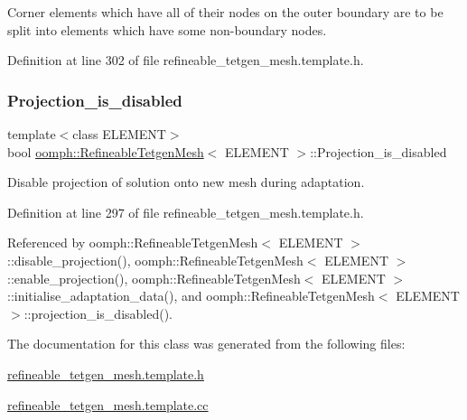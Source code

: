 Corner elements which have all of their nodes on the outer boundary are to be split into elements which have some non-\/boundary nodes. 



Definition at line 302 of file refineable\+\_\+tetgen\+\_\+mesh.\+template.\+h.

\mbox{\label{classoomph_1_1RefineableTetgenMesh_a274ebedf983f3b34620fa2bbb1980fcd}} 
\subsubsection{\texorpdfstring{Projection\+\_\+is\+\_\+disabled}{Projection\_is\_disabled}}
{\footnotesize\ttfamily template$<$class E\+L\+E\+M\+E\+NT$>$ \\
bool \hyperlink{classoomph_1_1RefineableTetgenMesh}{oomph\+::\+Refineable\+Tetgen\+Mesh}$<$ E\+L\+E\+M\+E\+NT $>$\+::Projection\+\_\+is\+\_\+disabled\hspace{0.3cm}{\ttfamily [protected]}}



Disable projection of solution onto new mesh during adaptation. 



Definition at line 297 of file refineable\+\_\+tetgen\+\_\+mesh.\+template.\+h.



Referenced by oomph\+::\+Refineable\+Tetgen\+Mesh$<$ E\+L\+E\+M\+E\+N\+T $>$\+::disable\+\_\+projection(), oomph\+::\+Refineable\+Tetgen\+Mesh$<$ E\+L\+E\+M\+E\+N\+T $>$\+::enable\+\_\+projection(), oomph\+::\+Refineable\+Tetgen\+Mesh$<$ E\+L\+E\+M\+E\+N\+T $>$\+::initialise\+\_\+adaptation\+\_\+data(), and oomph\+::\+Refineable\+Tetgen\+Mesh$<$ E\+L\+E\+M\+E\+N\+T $>$\+::projection\+\_\+is\+\_\+disabled().



The documentation for this class was generated from the following files\+:\begin{DoxyCompactItemize}
\item 
\hyperlink{refineable__tetgen__mesh_8template_8h}{refineable\+\_\+tetgen\+\_\+mesh.\+template.\+h}\item 
\hyperlink{refineable__tetgen__mesh_8template_8cc}{refineable\+\_\+tetgen\+\_\+mesh.\+template.\+cc}\end{DoxyCompactItemize}
